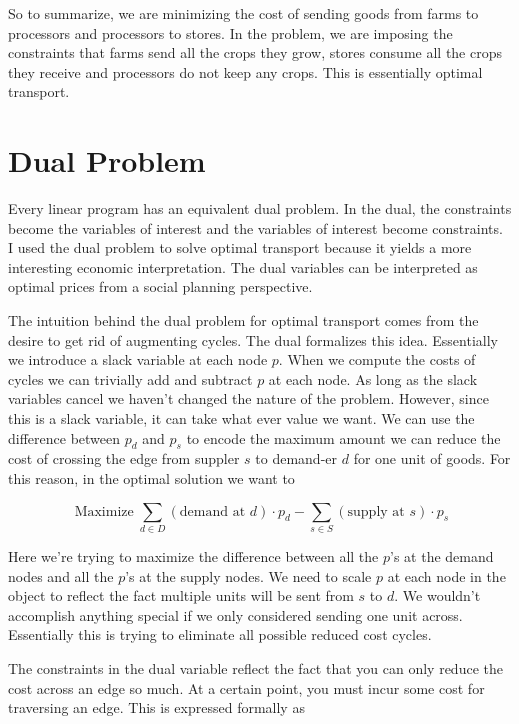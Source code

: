 \documentclass{report}
\begin{document}
So to summarize, we are minimizing the cost of sending goods from farms to processors and processors to stores. In the problem, we are imposing the constraints that farms send all the crops they grow, stores consume all the crops they receive and processors do not keep any crops. This is essentially optimal transport.

\section{Dual Problem}

Every linear program has an equivalent dual problem. In the dual, the constraints become the variables of interest and the variables of interest become constraints. I used the dual problem to solve optimal transport because it yields a more interesting economic interpretation. The dual variables can be interpreted as optimal prices from a social planning perspective.

The intuition behind the dual problem for optimal transport comes from the desire to get rid of augmenting cycles. The dual formalizes this idea. Essentially we introduce a slack variable at each node $p$. When we compute the costs of cycles we can trivially add and subtract $p$ at each node. As long as the slack variables cancel we haven't changed the nature of the problem. However, since this is a slack variable, it can take what ever value we want. We can use the difference between $p_d$ and $p_s$ to encode the maximum amount we can reduce the cost of crossing the edge from suppler $s$ to demand-er $d$ for one unit of goods. For this reason, in the optimal solution we want to

$$\operatorname{Maximize} \sum_{d \in D}  (\text{demand at } d) \cdot p_{d} -   \sum_{s \in S}  (\text{supply at } s) \cdot p_{s} $$

Here we're trying to maximize the difference between all the $p$'s at the demand nodes and all the $p$'s at the supply nodes. We need to scale $p$ at each node in the object to reflect the fact multiple units will be sent from $s$ to $d$. We wouldn't accomplish anything special if we only considered sending one unit across. Essentially this is trying to eliminate all possible reduced cost cycles.

The constraints in the dual variable reflect the fact that you can only reduce the cost across an edge so much. At a certain point, you must incur some cost for traversing an edge. This is expressed formally as
\end{document}
